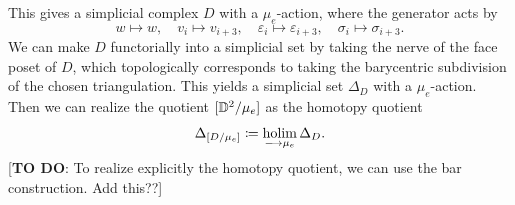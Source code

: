 This gives a simplicial complex $D$ with a $\mu_e$-action, where the generator acts by
\begin{equation}
w \mapsto w, \quad v_i \mapsto v_{i+3}, \quad \varepsilon_i \mapsto \varepsilon_{i+3}, \quad \sigma_{i} \mapsto \sigma_{i+3}.
\end{equation}
We can make $D$ functorially into a simplicial set by taking the nerve of the face poset of $D$, which topologically corresponds to taking the barycentric subdivision of the chosen triangulation. This yields a simplicial set $\Delta_D$ with a $\mu_e$-action. Then we can realize the quotient $[\mathbb{D}^2 / \mu_e]$ as the homotopy quotient
\begin{equation}
\Delta_{[D/\mu_e]} \coloneqq \operatorname*{holim}_{\longrightarrow \mu_e} \Delta_D.
\end{equation}
[\textbf{TO DO}: To realize explicitly the homotopy quotient, we can use the bar construction. Add this??]

